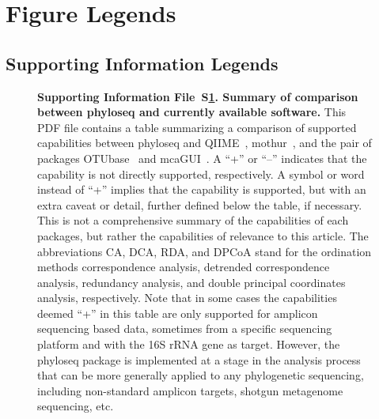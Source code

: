 \documentclass[10pt]{article}\usepackage{graphicx, color}
\begin{document}
\section*{Figure Legends}


\subsection*{Supporting Information Legends}
\captionsetup{labelformat=empty, labelsep=none} 
\setcounter{figure}{0}


\begin{figure}[!ht]
\begin{center}
\end{center}
\caption{
{\bf Supporting Information File~S\ref{supp:comparison}.
Summary of comparison between phyloseq and currently available software.}
This PDF file contains a table summarizing a comparison of supported capabilities between phyloseq and QIIME~\cite{caporaso2010qiime}, mothur~\cite{mothur}, and the pair of packages OTUbase~\cite{Beck:2011dc} and mcaGUI~\cite{Copeland:2012co}. 
A ``+'' or ``--'' indicates that the capability is not directly supported, respectively. A symbol or word instead of ``+'' implies that the capability is supported, but with an extra caveat or detail, further defined below the table, if necessary. This is not a comprehensive summary of the capabilities of each packages, but rather the capabilities of relevance to this article. 
The abbreviations CA, DCA, RDA, and DPCoA stand for the ordination methods correspondence analysis, detrended correspondence analysis, redundancy analysis, and double principal coordinates analysis, respectively. 
Note that in some cases the capabilities deemed ``+'' in this table are only supported for amplicon sequencing based data, sometimes from a specific sequencing platform and with the 16S rRNA gene as target. However, the phyloseq package is implemented at a stage in the analysis process that can be more generally applied to any phylogenetic sequencing, including non-standard amplicon targets, shotgun metagenome sequencing, etc. 
}
\label{supp:comparison}
\end{figure}
\end{document}
